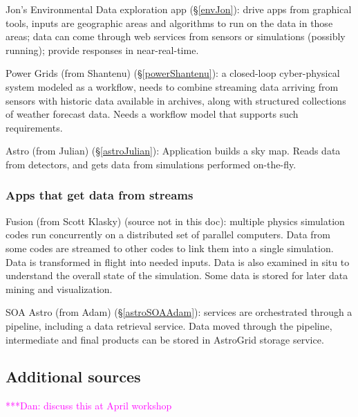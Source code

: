 \documentclass[preprint,12pt]{article}
\newcommand{\katznote}[1]{ {\textcolor{magenta}    { ***Dan:      #1 }}}
\newcommand{\katznote}[1]{}
\begin{document}
Jon's Environmental Data exploration app (\S\ref{envJon}): drive apps from graphical tools, inputs are geographic areas and algorithms to run on the data in those areas; data can come through web services from sensors or simulations (possibly running); provide responses in near-real-time.

Power Grids (from Shantenu) (\S\ref{powerShantenu}): a closed-loop cyber-physical system modeled as a workflow,
needs to combine streaming data arriving from sensors with historic
data available in archives, along with structured collections of
weather forecast data. Needs a workflow model that supports such
requirements.

Astro (from Julian) (\S\ref{astroJulian}): Application builds a sky map.  Reads data from detectors, and gets data from simulations performed on-the-fly.

\subsubsection{Apps that get data from streams}

Fusion (from Scott Klasky) (source not in this doc): multiple physics simulation codes run concurrently on a distributed set of parallel computers.  Data from some codes are streamed to other codes to link them into a single simulation.  Data is transformed in flight into needed inputs.  Data is also examined in situ to understand the overall state of the simulation.  Some data is stored for later data mining and visualization.

SOA Astro (from Adam) (\S\ref{astroSOAAdam}): services are orchestrated through a pipeline, including a data retrieval service.  Data moved through the pipeline, intermediate and final products can be stored in AstroGrid storage service.


\subsection{Additional sources}

\katznote{discuss this at April workshop}
\end{document}
